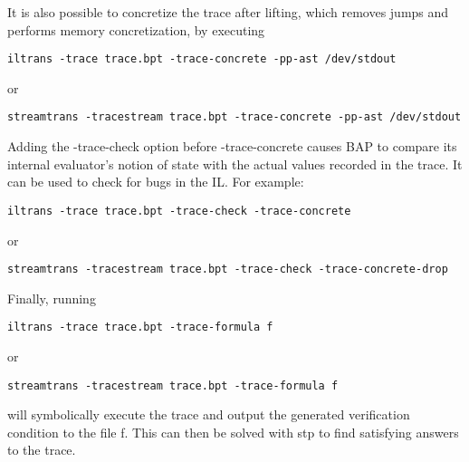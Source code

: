 It is also possible to concretize the trace after lifting, which
removes jumps and performs memory concretization, by executing

\begin{verbatim}
iltrans -trace trace.bpt -trace-concrete -pp-ast /dev/stdout
\end{verbatim}
or
\begin{verbatim}
streamtrans -tracestream trace.bpt -trace-concrete -pp-ast /dev/stdout
\end{verbatim}

Adding the -trace-check option before -trace-concrete causes BAP to
compare its internal evaluator's notion of state with the actual
values recorded in the trace.  It can be used to check for bugs in the
IL.  For example:

\begin{verbatim}
iltrans -trace trace.bpt -trace-check -trace-concrete
\end{verbatim}
or
\begin{verbatim}
streamtrans -tracestream trace.bpt -trace-check -trace-concrete-drop
\end{verbatim}


Finally, running
%
\begin{verbatim}
iltrans -trace trace.bpt -trace-formula f
\end{verbatim}
or
\begin{verbatim}
streamtrans -tracestream trace.bpt -trace-formula f
\end{verbatim}

will symbolically execute the trace and output the generated verification
condition to the file f. This can then be solved with stp to find satisfying
answers to the trace.

